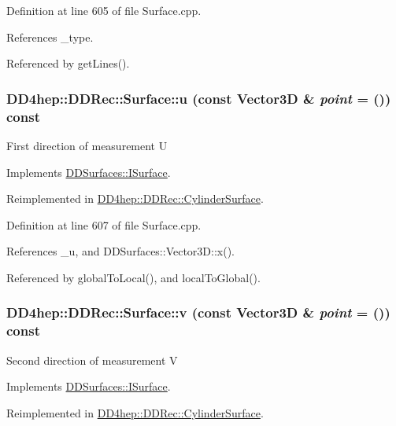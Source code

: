 Definition at line 605 of file Surface.cpp.

References \_\-type.

Referenced by getLines().\hypertarget{class_d_d4hep_1_1_d_d_rec_1_1_surface_af08e3ae0be217b8bc54d9a447a66be03}{
\subsubsection[{u}]{ DD4hep::DDRec::Surface::u (const {\bf Vector3D} \& {\em point} = {()}) const}}
\label{class_d_d4hep_1_1_d_d_rec_1_1_surface_af08e3ae0be217b8bc54d9a447a66be03}
First direction of measurement U 

Implements \hyperlink{class_d_d_surfaces_1_1_i_surface_a09fd4aa43cc96d50b4b81b94107f7d8f}{DDSurfaces::ISurface}.

Reimplemented in \hyperlink{class_d_d4hep_1_1_d_d_rec_1_1_cylinder_surface_adb01b4c563ea150f1c2a4d595beca0e6}{DD4hep::DDRec::CylinderSurface}.

Definition at line 607 of file Surface.cpp.

References \_\-u, and DDSurfaces::Vector3D::x().

Referenced by globalToLocal(), and localToGlobal().\hypertarget{class_d_d4hep_1_1_d_d_rec_1_1_surface_a76edfb105ebae153080713c99a310044}{
\subsubsection[{v}]{ DD4hep::DDRec::Surface::v (const {\bf Vector3D} \& {\em point} = {()}) const}}
\label{class_d_d4hep_1_1_d_d_rec_1_1_surface_a76edfb105ebae153080713c99a310044}
Second direction of measurement V 

Implements \hyperlink{class_d_d_surfaces_1_1_i_surface_a61c9f2057ea0383b39ead13a147b2838}{DDSurfaces::ISurface}.

Reimplemented in \hyperlink{class_d_d4hep_1_1_d_d_rec_1_1_cylinder_surface_a8cf924dc19c5eb87e435dd1918e14407}{DD4hep::DDRec::CylinderSurface}.

